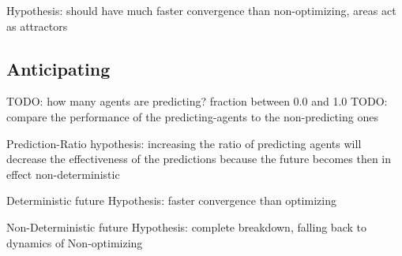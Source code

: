 Hypothesis: should have much faster convergence than non-optimizing, areas act as attractors

\subsection{Anticipating}
TODO: how many agents are predicting? fraction between 0.0 and 1.0
TODO: compare the performance of the predicting-agents to the non-predicting ones

Prediction-Ratio hypothesis: increasing the ratio of predicting agents will decrease the effectiveness of the predictions because the future becomes then in effect non-deterministic

Deterministic future Hypothesis: 				faster convergence than optimizing

Non-Deterministic future Hypothesis:			complete breakdown, falling back to dynamics of Non-optimizing